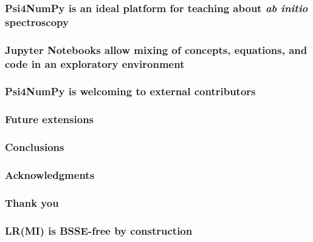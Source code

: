 \documentclass[%
    xcolor=usenames,dvipsnames,svgnames%
]{beamer}
\newcommand\pfn{Psi4NumPy}
\begin{document}
\begin{frame}
  \frametitle{\pfn{} is an ideal platform for teaching about \textit{ab initio} spectroscopy}
\end{frame}

\begin{frame}
  \frametitle{Jupyter Notebooks allow mixing of concepts, equations, and code in an exploratory environment}
\end{frame}

\begin{frame}
  \frametitle{\pfn{} is welcoming to external contributors}
\end{frame}

\begin{frame}
  \frametitle{Future extensions}
\end{frame}

\begin{frame}
  \frametitle{Conclusions}
\end{frame}

\begin{frame}
  \frametitle{Acknowledgments}
\end{frame}

\begin{frame}
  \frametitle{Thank you}
\end{frame}

\appendix

\begin{frame}
  \frametitle{LR(MI) is BSSE-free by construction}
\end{frame}

\immediate\closeout\tempfile
\end{document}

